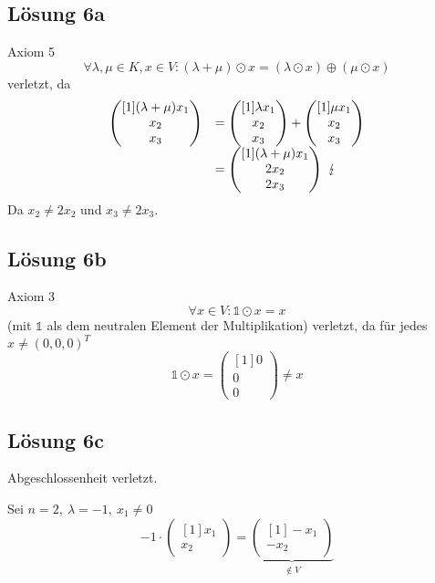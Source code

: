 \documentclass[main.tex]{subfiles}
\begin{document}
\subsection{Lösung 6a}
Axiom 5
\begin{equation*}
    \forall \lambda ,\mu \in K,x\in V:( \lambda +\mu ) \odot x=( \lambda \odot x) \oplus ( \mu \odot x)
\end{equation*}
verletzt, da
\begin{equation*}
    \begin{array}{ c l }
    \begin{pmatrix}[1]
    ( \lambda +\mu ) x_{1}\\
    x_{2}\\
    x_{3}
    \end{pmatrix} & =\begin{pmatrix}[1]
    \lambda x_{1}\\
    x_{2}\\
    x_{3}
    \end{pmatrix} +\begin{pmatrix}[1]
    \mu x_{1}\\
    x_{2}\\
    x_{3}
    \end{pmatrix}\\
    & =\begin{pmatrix}[1]
    ( \lambda +\mu ) x_{1}\\
    2x_{2}\\
    2x_{3}
    \end{pmatrix} \ \lightning 
    \end{array}
\end{equation*}
Da $x_{2} \neq 2x_{2}$ und $x_{3} \neq 2x_{3}$.


\subsection{Lösung 6b}
Axiom 3
\begin{equation*}
    \forall x\in V:\mathbb{1} \odot x=x
\end{equation*}
(mit $\mathbb{1}$ als dem neutralen Element der Multiplikation) verletzt, da für jedes $x \neq {(0, 0, 0)}^{T}$ 
\begin{equation*}
    \mathbb{1} \odot x=\begin{pmatrix}[1]
    0\\
    0\\
    0
    \end{pmatrix} \neq x
\end{equation*}


\subsection{Lösung 6c}
Abgeschlossenheit verletzt.

Sei $n=2,\ \lambda =-1,\ x_{1} \neq 0$
\begin{equation*}
    -1\cdotp \begin{pmatrix}[1]
    x_{1}\\
    x_{2}
    \end{pmatrix} =\underbrace{\begin{pmatrix}[1]
    -x_{1}\\
    -x_{2}
    \end{pmatrix}}_{\notin V}
\end{equation*}
\end{document}
